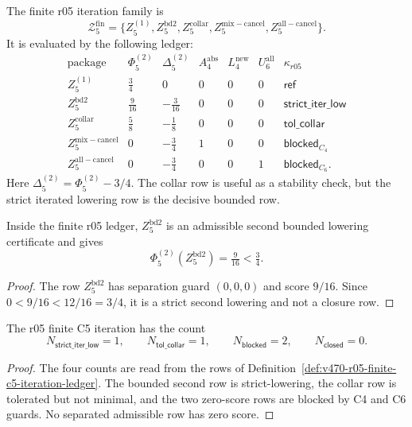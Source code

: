 \begin{definition}
\label{def:v470-r05-finite-c5-iteration-ledger}
The finite r05 iteration family is
\[
\mathcal Z_{5}^{\mathrm{fin}}
=
\{Z_5^{(1)},Z_5^{\mathrm{bd2}},Z_5^{\mathrm{collar}},
Z_5^{\mathrm{mix-cancel}},Z_5^{\mathrm{all-cancel}}\}.
\]
It is evaluated by the following ledger:
\[
\begin{array}{c|c|c|c|c|c|c}
\text{package} & \Phi_5^{(2)} & \Delta_5^{(2)} & A_4^{\mathrm{abs}} &
L_4^{\mathrm{new}} & U_6^{\mathrm{all}} & \kappa_{r05} \\
\hline
Z_5^{(1)} & \tfrac34 & 0 & 0 & 0 & 0 & \mathsf{ref} \\
Z_5^{\mathrm{bd2}} & \tfrac{9}{16} & -\tfrac{3}{16} & 0 & 0 & 0 &
\mathsf{strict\_iter\_low} \\
Z_5^{\mathrm{collar}} & \tfrac58 & -\tfrac18 & 0 & 0 & 0 &
\mathsf{tol\_collar} \\
Z_5^{\mathrm{mix-cancel}} & 0 & -\tfrac34 & 1 & 0 & 0 &
\mathsf{blocked}_{C_4} \\
Z_5^{\mathrm{all-cancel}} & 0 & -\tfrac34 & 0 & 0 & 1 &
\mathsf{blocked}_{C_6}.
\end{array}
\]
Here \(\Delta_5^{(2)}=\Phi_5^{(2)}-3/4\).  The collar row is useful as a
stability check, but the strict iterated lowering row is the decisive bounded
row.
\end{definition}

\begin{lemma}
\label{lem:v470-r05-second-bounded-lowering}
Inside the finite r05 ledger, \(Z_5^{\mathrm{bd2}}\) is an admissible second
bounded lowering certificate and gives
\[
\Phi_5^{(2)}(Z_5^{\mathrm{bd2}})=\tfrac{9}{16}<\tfrac34.
\]
\end{lemma}

\begin{proof}
The row \(Z_5^{\mathrm{bd2}}\) has separation guard \((0,0,0)\) and score
\(9/16\).  Since \(0<9/16<12/16=3/4\), it is a strict second lowering and not a
closure row.
\end{proof}

\begin{proposition}
\label{prop:v470-r05-iteration-count}
The r05 finite C5 iteration has the count
\[
N_{\mathsf{strict\_iter\_low}}=1,
\qquad
N_{\mathsf{tol\_collar}}=1,
\qquad
N_{\mathsf{blocked}}=2,
\qquad
N_{\mathsf{closed}}=0.
\]
\end{proposition}

\begin{proof}
The four counts are read from the rows of
Definition~\ref{def:v470-r05-finite-c5-iteration-ledger}.  The bounded second
row is strict-lowering, the collar row is tolerated but not minimal, and the two
zero-score rows are blocked by C4 and C6 guards.  No separated admissible row has
zero score.
\end{proof}

